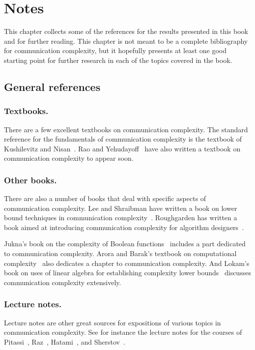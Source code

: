 \chapter{Notes}

This chapter collects some of the references for the results presented in this book and for further reading. This chapter is not meant to be a complete bibliography for communication complexity, but it hopefully presents at least one good starting point for further research in each of the topics covered in the book.

\section{General references}

\subsection*{Textbooks.}
There are a few excellent textbooks on communication complexity. The standard reference for the fundamentals of communication complexity is the textbook of Kushilevitz and Nisan~\cite{KushilevitzN97}. Rao and Yehudayoff~\cite{RaoYehudayoff18} have also written a textbook on communication complexity to appear soon.

\subsection*{Other books.}
There are also a number of books that deal with specific aspects of communication complexity. Lee and Shraibman have written a book on lower bound techniques in communication complexity~\cite{LeeS09}. Roughgarden has written a book aimed at introducing communication complexity for algorithm designers~\cite{Roughgarden16}. 

Jukna's book on the complexity of Boolean functions~\cite{Jukna12} includes a part dedicated to communication complexity. Arora and Barak's textbook on computational complexity~\cite{AroraB09} also dedicates a chapter to communication complexity. And Lokam's book on uses of linear algebra for establishing complexity lower bounds~\cite{Lokam09} discusses communication complexity extensively.

\subsection*{Lecture notes.}
Lecture notes are other great sources for expositions of various topics in communication complexity. See for instance the lecture notes for the courses of Pitassi~\cite{Pitassi14}, Raz~\cite{Raz00}, Hatami~\cite{Hatami16}, and Sherstov~\cite{Sherstov12}.

